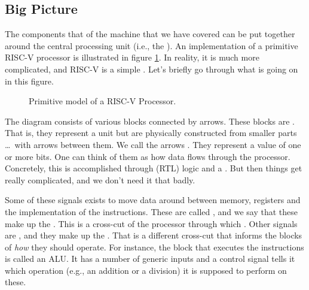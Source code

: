 

\subsection{Big Picture}

The components that of the machine that we have covered can be put together around the central processing unit (i.e., the ). An implementation of a primitive RISC-V processor is illustrated in figure \ref{fig:machine:riscv}. In reality, it is much more complicated, and RISC-V is a simple . Let's briefly go through what is going on in this figure.

\begin{figure}[tbp]
  
  \caption{Primitive model of a RISC-V Processor.}
  \label{fig:machine:riscv}
\end{figure}

The diagram consists of various blocks connected by arrows. These blocks are . That is, they represent a  unit but are physically constructed from smaller parts \ldots\ with arrows between them. We call the arrows . They represent a value of one or more bits. One can think of them as how data flows through the processor. Concretely, this is accomplished through  (RTL) logic and a . But then things get really complicated, and we don't need it that badly.

Some of these signals exists to move data around between memory, registers and the implementation of the instructions. These are called , and we say that these make up the . This is a cross-cut of the processor through which . Other signals are , and they make up the . That is a different cross-cut that informs the blocks of \textsl{how} they should operate. For instance, the block that executes the instructions is called an ALU. It has a number of generic inputs and a control signal tells it which operation (e.g., an addition or a division) it is supposed to perform on these.

